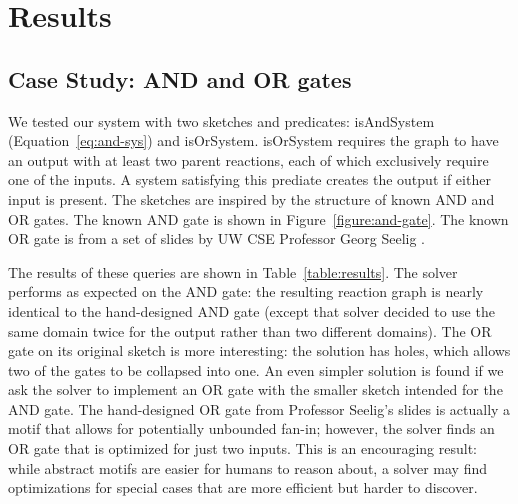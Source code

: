 \documentclass{article}[10pt]
\begin{document}
\section{Results}

\subsection{Case Study: AND and OR gates}

We tested our system with two sketches and predicates: isAndSystem
(Equation~\ref{eq:and-sys}) and isOrSystem. isOrSystem
requires the graph to have an output
with at least two parent reactions, each of which exclusively
require one of the inputs. A system satisfying this prediate creates the output
if either input is present.
The sketches are inspired by the structure of
known AND and OR gates. The known AND gate is shown in
Figure~\ref{figure:and-gate}. The known OR gate is from
a set of slides by UW CSE Professor Georg Seelig \cite{seelig}.

The results of these queries are shown in Table~\ref{table:results}.
The solver performs as expected on the AND gate: the resulting reaction graph
is nearly identical to the hand-designed AND gate (except that solver decided
to use the same domain twice for the output rather than two different domains).
The OR gate on its original sketch is more interesting: the solution has holes,
which allows two of the gates to be collapsed into one.
An even simpler solution is found if we ask the solver
to implement an OR gate with the smaller sketch intended for the AND gate.
The hand-designed OR gate from Professor Seelig's slides is actually a motif
that allows for potentially unbounded fan-in; however, the solver
finds an OR gate that is optimized for just two inputs. This
is an encouraging result: while abstract motifs are easier for
humans to reason about, a solver may find optimizations
for special cases that are more efficient but harder to discover.
\end{document}
